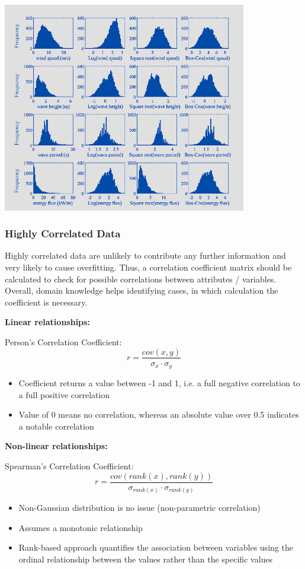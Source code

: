 \documentclass[12pt, a4paper, oneside, justified]{article}
\begin{document}
\begin{center}
\includegraphics[width=0.8\textwidth]{../img/3-19.png}
\end{center}

\subsubsection{Highly Correlated Data}

Highly correlated data are unlikely to contribute any further information and very likely to cause overfitting. Thus, a correlation coefficient matrix should be calculated to check for possible correlations between attributes / variables. Overall, domain knowledge helps identifying cases, in which calculation the coefficient is necessary.

\textbf{Linear relationships:}

Person's Correlation Coefficient:
$$
r=\frac{cov(x,y)}{\sigma_x\cdot\sigma_y}
$$
\begin{itemize}
    \item Coefficient returns a value between -1 and 1, i.e. a full negative correlation to a full positive correlation
    \item Value of 0 means no correlation, whereas an absolute value over 0.5 indicates a notable correlation
\end{itemize}

\textbf{Non-linear relationships:}

Spearman's Correlation Coefficient:
$$
r=\frac{cov(rank(x),rank(y))}{\sigma_{rank(x)}\cdot\sigma_{rank(y)}}
$$

\begin{itemize}
    \item Non-Gaussian distribution is no issue (non-parametric correlation)
    \item Assumes a monotonic relationship
    \item Rank-based approach quantifies the association between variables using the ordinal relationship between the values rather than the specific values
\end{itemize}
\end{document}
